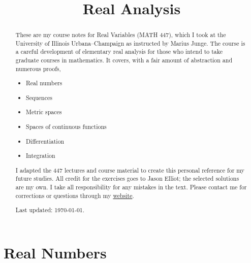 \documentclass[11pt,notitlepage]{report}
\title{Real Analysis}
\date{}
\begin{document}
    \maketitle
    \thispagestyle{empty}

    \begin{abstract}
        These are my course notes for Real Variables (MATH 447), which I took at the University of Illinois Urbana--Champaign as instructed by Marius Junge.
        The course is a careful development of elementary real analysis for those who intend to take graduate courses in mathematics.
        It covers, with a fair amount of abstraction and numerous proofs,
        \begin{itemize}[noitemsep]
            \item Real numbers
            \item Sequences
            \item Metric spaces
            \item Spaces of continuous functions
            \item Differentiation
            \item Integration
        \end{itemize}

        I adapted the 447 lectures and course material to create this personal reference for my future studies.
        All credit for the exercises goes to Jason Elliot; the selected solutions are my own.
        I take all responsibility for any mistakes in the text.
        Please contact me for corrections or questions through my \href{https://ericmordonez.com}{website}.

        Last updated: \today.
    \end{abstract}

    \tableofcontents
    \thispagestyle{empty}

    \pagestyle{main}

    \part{Real Numbers}
\end{document}
